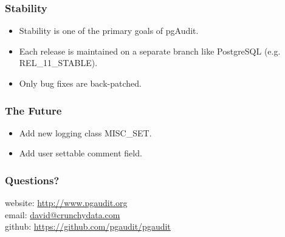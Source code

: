 \begin{frame}
    \frametitle{Stability}

    \begin{itemize}
        \item Stability is one of the primary goals of pgAudit.
        \item Each release is maintained on a separate branch like PostgreSQL (e.g. REL\_11\_STABLE).
        \item Only bug fixes are back-patched.
    \end{itemize}
\end{frame}

\begin{frame}
    \frametitle{The Future}

    \begin{itemize}
        \item Add new logging class MISC\_SET.
        \item Add user settable comment field.
    \end{itemize}
\end{frame}

\begin{frame}
    \frametitle{Questions?}

    website: \url{http://www.pgaudit.org}\\
    \vspace{1em}
    email: \href{mailto:david@crunchydata.com}{david@crunchydata.com}\\
    \vspace{1em}
    github: \url{https://github.com/pgaudit/pgaudit}\\
\end{frame}


